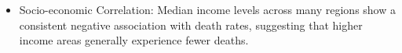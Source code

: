 \documentclass[
]{article}
\providecommand{\tightlist}{%
  \setlength{\itemsep}{0pt}\setlength{\parskip}{0pt}}\usepackage{longtable,booktabs,array}
\begin{document}
\begin{figure}


\caption{\label{fig-8-1}}

\end{figure}%

\begin{figure}


\caption{\label{fig-8-2}}

\end{figure}%

\begin{itemize}
\tightlist
\item
  Socio-economic Correlation: Median income levels across many regions
  show a consistent negative association with death rates, suggesting
  that higher income areas generally experience fewer deaths.
\end{itemize}
\end{document}
